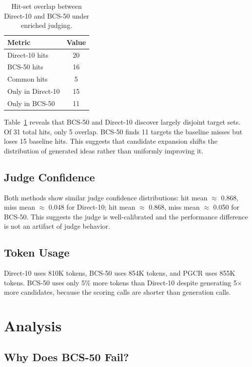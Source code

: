 \documentclass[wcp]{jmlr}
\begin{document}
\begin{table}[htp]
\centering
\caption{Hit-set overlap between Direct-10 and BCS-50 under enriched judging.}\label{tab:overlap}
\begin{tabular}{lc}
\toprule
Metric & Value \\
\midrule
Direct-10 hits & 20 \\
BCS-50 hits & 16 \\
Common hits & 5 \\
Only in Direct-10 & 15 \\
Only in BCS-50 & 11 \\
\bottomrule
\end{tabular}
\end{table}

Table~\ref{tab:overlap} reveals that BCS-50 and Direct-10 discover largely disjoint target sets. Of 31 total hits, only 5 overlap. BCS-50 finds 11 targets the baseline misses but loses 15 baseline hits. This suggests that candidate expansion shifts the distribution of generated ideas rather than uniformly improving it.

\subsection{Judge Confidence}

Both methods show similar judge confidence distributions: hit mean $\approx$ 0.868, miss mean $\approx$ 0.048 for Direct-10; hit mean $\approx$ 0.868, miss mean $\approx$ 0.050 for BCS-50. This suggests the judge is well-calibrated and the performance difference is not an artifact of judge behavior.

\subsection{Token Usage}

Direct-10 uses 810K tokens, BCS-50 uses 854K tokens, and PGCR uses 855K tokens. BCS-50 uses only 5\% more tokens than Direct-10 despite generating 5$\times$ more candidates, because the scoring calls are shorter than generation calls.

\section{Analysis}\label{sec:analysis}

\subsection{Why Does BCS-50 Fail?}
\end{document}
